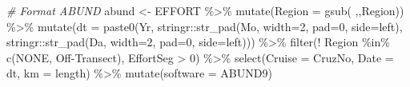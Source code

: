 \documentclass[
]{book}
\newenvironment{Shaded}{\begin{snugshade}}{\end{snugshade}}
\newcommand{\AttributeTok}[1]{\textcolor[rgb]{0.77,0.63,0.00}{#1}}
\newcommand{\CommentTok}[1]{\textcolor[rgb]{0.56,0.35,0.01}{\textit{#1}}}
\newcommand{\DecValTok}[1]{\textcolor[rgb]{0.00,0.00,0.81}{#1}}
\newcommand{\FunctionTok}[1]{\textcolor[rgb]{0.00,0.00,0.00}{#1}}
\newcommand{\NormalTok}[1]{#1}
\newcommand{\OtherTok}[1]{\textcolor[rgb]{0.56,0.35,0.01}{#1}}
\newcommand{\SpecialCharTok}[1]{\textcolor[rgb]{0.00,0.00,0.00}{#1}}
\newcommand{\StringTok}[1]{\textcolor[rgb]{0.31,0.60,0.02}{#1}}
\begin{document}
\begin{Shaded}
\begin{Highlighting}[]
\CommentTok{\# Format ABUND}
\NormalTok{abund }\OtherTok{\textless{}{-}} 
\NormalTok{  EFFORT }\SpecialCharTok{\%\textgreater{}\%} 
  \FunctionTok{mutate}\NormalTok{(}\AttributeTok{Region =} \FunctionTok{gsub}\NormalTok{(}\StringTok{\textquotesingle{} \textquotesingle{}}\NormalTok{,}\StringTok{\textquotesingle{}\textquotesingle{}}\NormalTok{,Region)) }\SpecialCharTok{\%\textgreater{}\%}
  \FunctionTok{mutate}\NormalTok{(}\AttributeTok{dt =} \FunctionTok{paste0}\NormalTok{(Yr,}
\NormalTok{                     stringr}\SpecialCharTok{::}\FunctionTok{str\_pad}\NormalTok{(Mo, }\AttributeTok{width=}\DecValTok{2}\NormalTok{, }\AttributeTok{pad=}\StringTok{\textquotesingle{}0\textquotesingle{}}\NormalTok{, }\AttributeTok{side=}\StringTok{\textquotesingle{}left\textquotesingle{}}\NormalTok{),}
\NormalTok{                     stringr}\SpecialCharTok{::}\FunctionTok{str\_pad}\NormalTok{(Da, }\AttributeTok{width=}\DecValTok{2}\NormalTok{, }\AttributeTok{pad=}\StringTok{\textquotesingle{}0\textquotesingle{}}\NormalTok{, }\AttributeTok{side=}\StringTok{\textquotesingle{}left\textquotesingle{}}\NormalTok{))) }\SpecialCharTok{\%\textgreater{}\%} 
  \FunctionTok{filter}\NormalTok{(}\SpecialCharTok{!}\NormalTok{ Region }\SpecialCharTok{\%in\%} \FunctionTok{c}\NormalTok{(}\StringTok{\textquotesingle{}NONE\textquotesingle{}}\NormalTok{, }\StringTok{\textquotesingle{}Off{-}Transect\textquotesingle{}}\NormalTok{),}
\NormalTok{         EffortSeg }\SpecialCharTok{\textgreater{}} \DecValTok{0}\NormalTok{) }\SpecialCharTok{\%\textgreater{}\%} 
  \FunctionTok{select}\NormalTok{(}\AttributeTok{Cruise =}\NormalTok{ CruzNo, }\AttributeTok{Date =}\NormalTok{ dt, }\AttributeTok{km =}\NormalTok{ length) }\SpecialCharTok{\%\textgreater{}\%} 
  \FunctionTok{mutate}\NormalTok{(}\AttributeTok{software =} \StringTok{\textquotesingle{}ABUND9\textquotesingle{}}\NormalTok{)}
  

\end{Highlighting}
\end{Shaded}
\end{document}
